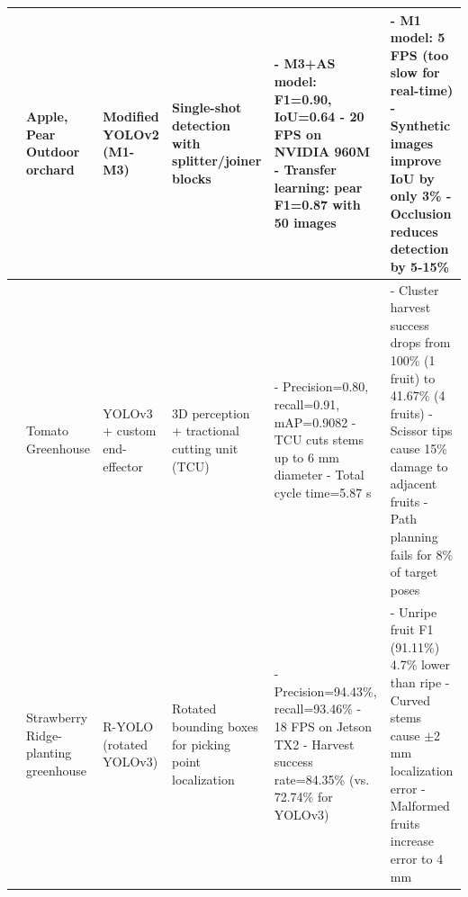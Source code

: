 \documentclass[a4paper,fleqn]{cas-dc}
\begin{document}
\begin{table}[htbp]
\begin{tabular}{@{}p{}p{}p{}p{}p{}p{}@{}}
	\cite{bresilla2019single} \newline 2019 & Apple, Pear \newline Outdoor orchard & Modified YOLOv2 (M1-M3) & Single-shot detection with splitter/joiner blocks & - M3+AS model: F1=0.90, IoU=0.64 \newline - 20 FPS on NVIDIA 960M \newline - Transfer learning: pear F1=0.87 with 50 images & - M1 model: 5 FPS (too slow for real-time) \newline - Synthetic images improve IoU by only 3\% \newline - Occlusion reduces detection by 5-15\% \\ \midrule
	\cite{jun2021towards} \newline 2021 & Tomato \newline Greenhouse & YOLOv3 + custom end-effector & 3D perception + tractional cutting unit (TCU) & - Precision=0.80, recall=0.91, mAP=0.9082 \newline - TCU cuts stems up to 6 mm diameter \newline - Total cycle time=5.87 s & - Cluster harvest success drops from 100\% (1 fruit) to 41.67\% (4 fruits) \newline - Scissor tips cause 15\% damage to adjacent fruits \newline - Path planning fails for 8\% of target poses \\ \midrule
	\cite{yu2020real} \newline 2020 & Strawberry \newline Ridge-planting greenhouse & R-YOLO (rotated YOLOv3) & Rotated bounding boxes for picking point localization & - Precision=94.43\%, recall=93.46\% \newline - 18 FPS on Jetson TX2 \newline - Harvest success rate=84.35\% (vs. 72.74\% for YOLOv3) & - Unripe fruit F1 (91.11\%) 4.7\% lower than ripe \newline - Curved stems cause $\pm$2 mm localization error \newline - Malformed fruits increase error to 4 mm \\ \midrule

	\end{tabular}
\end{table}
\end{document}
